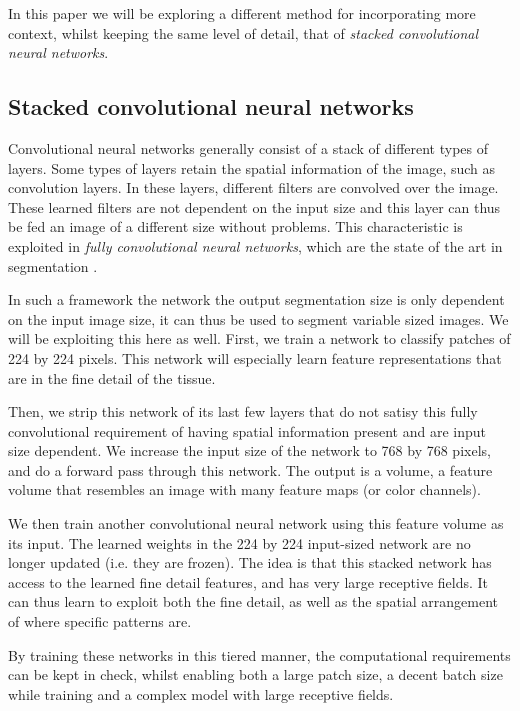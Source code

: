 \documentclass[journal]{IEEEtran}
\begin{document}
In this paper we will be exploring a different method for incorporating more context, whilst keeping the same level of detail, that of \emph{stacked convolutional neural networks}.  

\subsection{Stacked convolutional neural networks}
Convolutional neural networks generally consist of a stack of different types of layers. Some types of layers retain the spatial information of the image, such as convolution layers. In these layers, different filters are convolved over the image. These learned filters are not dependent on the input size and this layer can thus be fed an image of a different size without problems. This characteristic is exploited in \emph{fully convolutional neural networks}, which are the state of the art in segmentation \cite{long2015fully}. 

In such a framework the network the output segmentation size is only dependent on the input image size, it can thus be used to segment variable sized images. We will be exploiting this here as well. First, we train a network to classify patches of 224 by 224 pixels. This network will especially learn feature representations that are in the fine detail of the tissue. 

Then, we strip this network of its last few layers that do not satisy this fully convolutional requirement of having spatial information present and are input size dependent. We increase the input size of the network to 768 by 768 pixels, and do a forward pass through this network. The output is a volume, a feature volume  that resembles an image with many feature maps (or color channels). 

We then train another convolutional neural network using this feature volume as its input. The learned weights in the 224 by 224 input-sized network are no longer updated (i.e. they are frozen). The idea is that this stacked network has access to the learned fine detail features, and has very large receptive fields. It can thus learn to exploit both the fine detail, as well as the spatial arrangement of where specific patterns are.

By training these networks in this tiered manner, the computational requirements can be kept in check, whilst enabling both a large patch size, a decent batch size while training and a complex model with large receptive fields.
\end{document}

